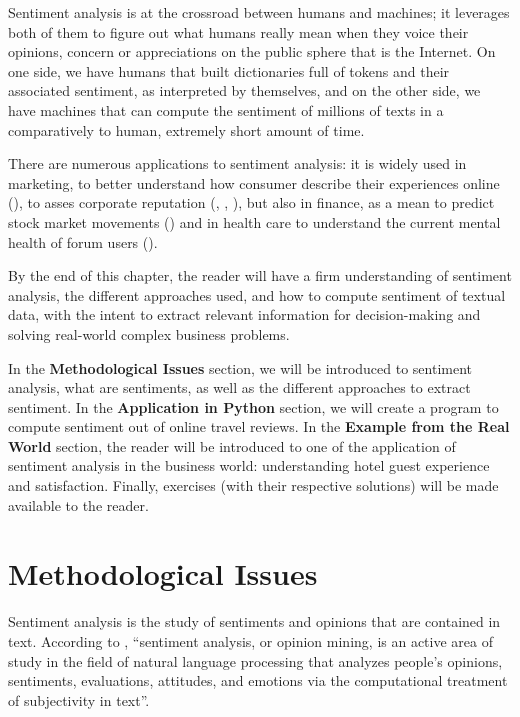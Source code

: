 	Sentiment analysis is at the crossroad between humans and machines; it leverages both of them to figure out what humans really mean when they voice their opinions, concern or appreciations on the public sphere that is the Internet. On one side, we have humans that built dictionaries full of tokens and their associated sentiment, as interpreted by themselves, and on the other side, we have machines that can compute the sentiment of millions of texts in a comparatively to human, extremely short amount of time.
	
	There are numerous applications to sentiment analysis: it is widely used in marketing, to better understand how consumer describe their experiences online (\citealp{xiang_what_2015}), to asses corporate reputation (\citealp{oconnor_managing_2010}, \citealp{vidya_twitter_2015}, \citealp{chung_evolution_2019}), but also in finance, as a mean to predict stock market movements (\citealp{mohan_stock_2019}) and in health care to understand the current mental health of forum users (\citealp{davcheva_user_2019}).
	
	By the end of this chapter, the reader will have a firm understanding of sentiment analysis, the different approaches used, and how to compute sentiment of textual data, with the intent to extract relevant information for decision-making and solving real-world complex business problems.
	
	In the \textbf{Methodological Issues} section, we will be introduced to sentiment analysis, what are sentiments, as well as the different approaches to extract sentiment. In the \textbf{Application in Python} section, we will create a program to compute sentiment out of online travel reviews. In the \textbf{Example from the Real World} section, the reader will be introduced to one of the application of sentiment analysis in the business world: understanding hotel guest experience and satisfaction. Finally, exercises (with their respective solutions) will be made available to the reader.
	\section{Methodological Issues}

	Sentiment analysis is the study of sentiments and opinions that are contained in text. According to \cite{hutto_vader_2014} \citep{hutto_vader_2014}, ``sentiment analysis, or opinion mining, is an active area of study in the field of natural language processing that analyzes people's opinions, sentiments, evaluations, attitudes, and emotions via the computational treatment of subjectivity in text''.

